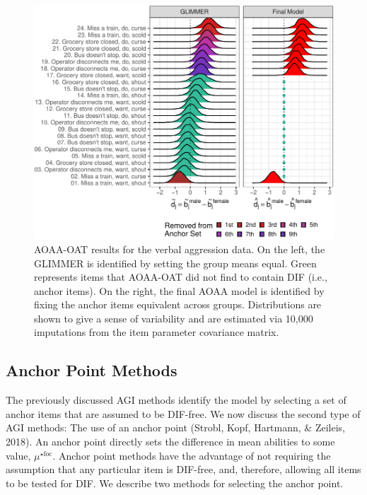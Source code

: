 \documentclass[
  english,
  man,floatsintext]{apa6}
\begin{document}
\begin{figure}[h]

{\centering \includegraphics{paper_apa_files/figure-latex/aoaaoat-1} 

}

\caption{AOAA-OAT results for the verbal aggression data. On the left, the GLIMMER is identified by setting the group means equal. Green represents items that AOAA-OAT did not find to contain DIF (i.e., anchor items). On the right, the final AOAA model is identified by fixing the anchor items equivalent across groups. Distributions are shown to give a sense of variability and are estimated via 10,000 imputations from the item parameter covariance matrix.}\label{fig:aoaaoat}
\end{figure}

\hypertarget{anchor-point-methods}{%
\subsection{Anchor Point Methods}\label{anchor-point-methods}}

The previously discussed AGI methods identify the model by selecting a set of anchor items that are assumed to be DIF-free. We now discuss the second type of AGI methods: The use of an anchor point (Strobl, Kopf, Hartmann, \& Zeileis, 2018). An anchor point directly sets the difference in mean abilities to some value, \(\mu^{\star\text{foc}}\). Anchor point methods have the advantage of not requiring the assumption that any particular item is DIF-free, and, therefore, allowing all items to be tested for DIF. We describe two methods for selecting the anchor point.
\end{document}

